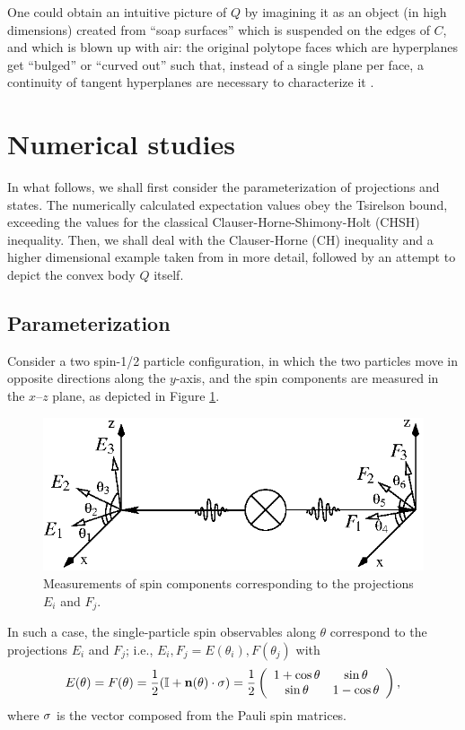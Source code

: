 \documentclass[pra,showpacs,showkeys,amsfonts]{revtex4}
\begin{document}
One could obtain an intuitive picture of $Q$ by imagining
it as an object (in high dimensions) created from ``soap surfaces''
which is suspended on the edges of
$C$, and which is blown up with air: the original polytope
faces which are hyperplanes get ``bulged''
or ``curved out'' such that,
instead of a single plane
per face,
a continuity of tangent hyperplanes are
necessary to characterize it
\cite{khalfin-97}.

\section{Numerical studies}

In what follows, we shall first consider
the parameterization of projections and states.
The numerically calculated expectation values obey
the Tsirelson bound, exceeding the
values for the classical Clauser-Horne-Shimony-Holt (CHSH) inequality.
Then, we shall deal with the Clauser-Horne (CH) inequality and a higher
dimensional example taken from \cite{2000-poly} in more detail,
followed by an attempt to depict the convex body $Q$ itself.

\subsection{Parameterization}

Consider a two spin-1/2 particle configuration,
in which the two particles move in opposite directions along the $y$-axis,
and the spin components are measured in the $x$--$z$ plane,
as depicted in Figure \ref{f-2003-qpoly-1}.
\begin{figure}%
  \centering
\includegraphics{2003-qpoly-eifj}
  \caption{Measurements of spin components corresponding to the projections  ${E}_i$ and ${F}_j$.}
  \label{f-2003-qpoly-1}
\end{figure}
In such a case, the single-particle
 spin observables along $\theta$ correspond to the projections
$E_{i}$ and $F_{j}$; i.e., $E_i,F_j=E(\theta_i),F(\theta_j)$ with
\begin{equation}
  \label{e-2003-qpoly-1}
E(\theta )=F(\theta )=\frac{1}{2}({\Bbb I} +{\bf n}(\theta)\cdot{\bf \sigma})=
\frac{1}{2}\left(
  \begin{array}{cc}
    1 + \cos\theta& \sin\theta\\
    \sin\theta&1 - \cos\theta
    \end{array}
\right),
\end{equation}
where ${\bf \sigma}$ is the vector composed from the Pauli spin matrices.
\end{document}

